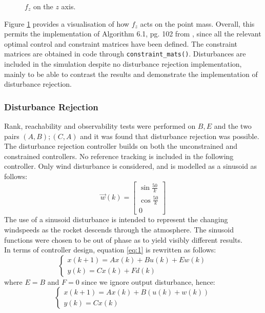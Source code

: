 \documentclass[conference, tikz]{IEEEtran}
\begin{document}
\begin{figure}[H]
\centering
{}
\caption{$f_z$ on the $z$ axis.} \label{tikz:axes}
\end{figure}

Figure \ref{tikz:axes} provides a visualisation of how $f_z$ acts on the point mass. 
Overall, this permits the implementation of Algorithm 6.1, pg. 102 from \cite{test}, since all the relevant optimal control and constraint matrices have been defined. 
The constraint matrices are obtained in code through \verb|constraint_mats()|. 
Disturbances are included in the simulation despite no disturbance rejection implementation, mainly to be able to contrast the results and demonstrate the implementation of disturbance rejection.

\subsubsection{Disturbance Rejection}
Rank, reachability and observability tests were performed on $B, E$ and the two pairs $(A, B); (C, A)$ and it was found that disturbance rejection was possible. 
The disturbance rejection controller builds on both the unconstrained and constrained controllers. No reference tracking is included in the following controller. 
Only wind disturbance is considered, and is modelled as a sinusoid as follows:
\[
    \vec{w}(k)
    =
    \begin{bmatrix}
        \sin{\frac{50}{k}}\\
        \cos{\frac{50}{k}}\\
        0
    \end{bmatrix}
\]
The use of a sinusoid disturbance is intended to represent the changing windspeeds as the rocket descends through the atmosphere. The sinusoid functions were chosen to be out of phase as to yield visibly different results. 
\\
In terms of controller design, equation \ref{eq:1} is rewritten as follows:
\[
    \begin{cases}
    x(k+1) = Ax(k) + Bu(k) + Ew(k)\\
    y(k) = Cx(k) + Fd(k)
    \end{cases}
\]
where $E = B$ and $F=0$ since we ignore output disturbance, hence:
\[
    \begin{cases}
        x(k+1) = Ax(k) + B(u(k) + w(k))\\
        y(k) = Cx(k)
    \end{cases}
\]
\end{document}
